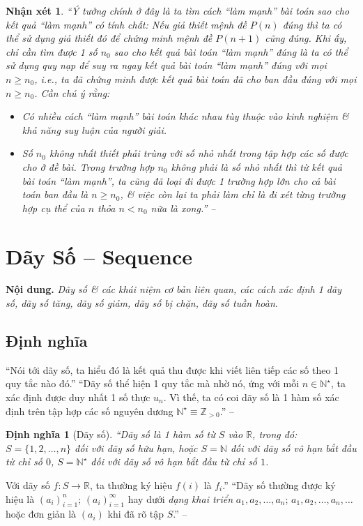 \documentclass[oneside]{book}
\numberwithin{equation}{section}
\newtheorem{nhanxet}{Nhận xét}[section]
\newtheorem{dinhnghia}{Định nghĩa}[section]
\begin{document}
\begin{nhanxet}
	``Ý tưởng chính ở đây là ta tìm cách ``làm mạnh'' bài toán sao cho kết quả ``làm mạnh'' có tính chất: \emph{Nếu giả thiết mệnh đề $P(n)$ đúng thì ta có thể sử dụng giả thiết đó để chứng minh mệnh đề $P(n + 1)$ cũng đúng}. Khi ấy, chỉ cần tìm được 1 số $n_0$ sao cho kết quả bài toán ``làm mạnh'' đúng là ta có thể sử dụng quy nạp để suy ra ngay kết quả bài toán ``làm mạnh'' đúng với mọi $n\ge n_0$, i.e., ta đã chứng minh được kết quả bài toán đã cho ban đầu đúng với mọi $n\ge n_0$. Cần chú ý rằng: 
	\begin{itemize}
		\item Có nhiều cách ``làm mạnh'' bài toán khác nhau tùy thuộc vào kinh nghiệm \& khả năng suy luận của người giải.
		\item Số $n_0$ không nhất thiết phải trùng với số nhỏ nhất trong tập hợp các số được cho ở đề bài. Trong trường hợp $n_0$ không phải là số nhỏ nhất thì từ kết quả bài toán ``làm mạnh'', ta cũng đã loại đi được 1 trường hợp lớn cho cả bài toán ban đầu là $n\ge n_0$, \& việc còn lại ta phải làm chỉ là đi xét từng trường hợp cụ thể của $n$ thỏa $n < n_0$ nữa là xong.'' -- \cite[pp. 141--142]{TL_chuyen_Toan_Giai_Tich_12}
	\end{itemize}
\end{nhanxet}


\section{Dãy Số -- Sequence}
\textbf{Nội dung.} \textit{Dãy số \& các khái niệm cơ bản liên quan, các cách xác định 1 dãy số, dãy số tăng, dãy số giảm, dãy số bị chặn, dãy số tuần hoàn}.

\subsection{Định nghĩa}
``Nói tới dãy số, ta hiểu đó là kết quả thu được khi viết liên tiếp các số theo 1 quy tắc nào đó.'' ``Dãy số thể hiện 1 quy tắc mà nhờ nó, ứng với mỗi $n\in\mathbb{N}^\star$, ta xác định được duy nhất 1 số thực $u_n$. Vì thế, ta có coi dãy số là 1 hàm số xác định trên tập hợp các số nguyên dương $\mathbb{N}^\star\equiv\mathbb{Z}_{> 0}$.'' -- \cite[p. 116]{TL_chuyen_Toan_Dai_So_Giai_Tich_11}

\begin{dinhnghia}[Dãy số]
	``\emph{Dãy số} là 1 hàm số từ $S$ vào $\mathbb{R}$, trong đó: $S = \{1,2,\ldots,n\}$ đối với \emph{dãy số hữu hạn}, hoặc $S = \mathbb{N}$ đối với \emph{dãy số vô hạn} bắt đầu từ chỉ số $0$, $S = \mathbb{N}^\star$ đối với dãy số vô hạn bắt đầu từ chỉ số $1$.
\end{dinhnghia}
Với dãy số $f:S\to\mathbb{R}$, ta thường ký hiệu $f(i)$ là $f_i$.'' ``Dãy số thường được ký hiệu là $(a_i)_{i=1}^n$; $(a_i)_{i=1}^\infty$ hay dưới \textit{dạng khai triển} $a_1,a_2,\ldots,a_n$; $a_1,a_2,\ldots,a_n,\ldots$ hoặc đơn giản là $(a_i)$ khi đã rõ tập $S$.'' -- \cite[p. 117]{TL_chuyen_Toan_Dai_So_Giai_Tich_11}
\end{document}
